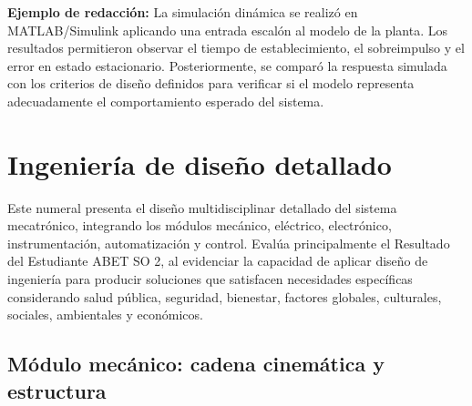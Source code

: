 \documentclass[12pt,letterpaper]{report}
\begin{document}
\begin{instrucciones}
\noindent \textbf{Ejemplo de redacción:} La simulación dinámica se realizó en MATLAB/Simulink aplicando una entrada escalón al modelo de la planta. Los resultados permitieron observar el tiempo de establecimiento, el sobreimpulso y el error en estado estacionario. Posteriormente, se comparó la respuesta simulada con los criterios de diseño definidos para verificar si el modelo representa adecuadamente el comportamiento esperado del sistema.
\end{instrucciones}

\section{Ingeniería de diseño detallado}

\begin{instrucciones}
Este numeral presenta el diseño multidisciplinar detallado del sistema mecatrónico, integrando los módulos mecánico, eléctrico, electrónico, instrumentación, automatización y control. Evalúa principalmente el Resultado del Estudiante ABET SO 2, al evidenciar la capacidad de aplicar diseño de ingeniería para producir soluciones que satisfacen necesidades específicas considerando salud pública, seguridad, bienestar, factores globales, culturales, sociales, ambientales y económicos.
\end{instrucciones}

\subsection{Módulo mecánico: cadena cinemática y estructura}
\end{document}

